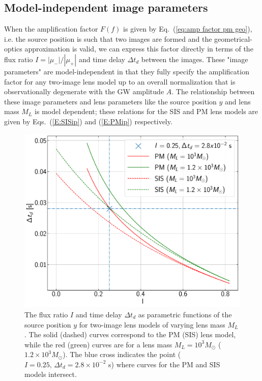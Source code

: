 \documentclass[floats,floatfix,showpacs,amssymb,prd,twocolumn,superscriptaddress,nofootinbib,nolongbibliography,reprint]{revtex4-2}
\begin{document}
\subsection{\label{subsec: model-independent lens parameters}Model-independent image parameters}

When the amplification factor $F(f)$ is given by Eq.~(\ref{eq:amp factor pm geo}), i.e. the source position is such that two images are formed and the geometrical-optics approximation is valid, we can express this factor directly in terms of the flux ratio $I = |\mu_-|/|\mu_+|$ and time delay $\Delta t_d$ between the images. These "image parameters" are model-independent in that they fully specify the amplification factor for any two-image lens model up to an overall normalization that is observationally degenerate with the GW amplitude $A$.  The relationship between these image parameters and lens parameters like the source position $y$ and lens mass $M_L$ is model dependent; these relations for the SIS and PM lens models are given by Eqs.~(\ref{E:SISip}) and (\ref{E:PMip}) respectively.
\begin{figure}[t!]
    \centering
    \includegraphics[scale = 0.27]{Figures/I-td_relation.pdf}
    \caption{
    The flux ratio $I$ and time delay $\Delta t_d$ as parametric functions of the source position $y$ for two-image lens models of varying lens mass $M_L$.  The solid (dashed) curves correspond to the PM (SIS) lens model, while the red (green) curves are for a lens mass $M_L = 10^3 M_\odot$ ($1.2 \times 10^3 M_\odot$). The blue cross indicates the point ($I = 0.25,\,\Delta t_d = 2.8 \times 10^{-2}$ s) where curves for the PM and SIS models intersect.
    }
    \label{fig:I-td sis}
\end{figure}
\end{document}

